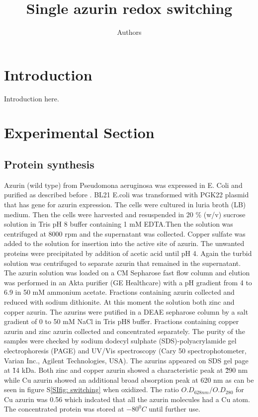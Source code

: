 \documentclass[journal=jacsat,manuscript=article]{achemso}
\author{Authors}
\affiliation{Huygens-Kamerlingh Onnes Laboratory, Leiden University, RA, Leiden, The Netherlands}
\title[]
{Single azurin redox switching}
\begin{document}
\section{Introduction}
Introduction here.
\section{Experimental Section}
\subsection{Protein synthesis}
Azurin (wild type) from Pseudomona aeruginosa was expressed in E. Coli and purified as described before \citep{kamp1990purification}. BL21 E.coli was transformed with PGK22 plasmid that has gene for azurin expression. The cells were cultured in luria broth (LB) medium. Then the cells were harvested and resuspended in 20 \% (w/v) sucrose solution in Tris pH 8 buffer containing 1 mM EDTA.Then the solution was centrifuged at 8000 rpm and the supernatant was collected. Copper sulfate was added to the solution for insertion into the active site of azurin. The unwanted proteins were precipitated by addition of acetic acid until pH 4. Again the turbid solution was centrifuged to separate azurin that remained in the supernatant. The azurin solution was loaded on a CM Sepharose fast flow column and elution was performed in an Akta purifier (GE Healthcare) with a pH gradient from 4 to 6.9 in 50 mM ammonium acetate. Fractions containing azurin collected and reduced with sodium dithionite. At this moment the solution both zinc and copper azurin. The azurins were putified in a DEAE sepharose column by a salt gradient of 0 to 50 mM NaCl in Tris pH8 buffer. Fractions containing copper azurin and zinc azurin collected and concentrated separately. The purity of the samples were checked by sodium dodecyl sulphate (SDS)-polyacrylamide gel electrophoresis (PAGE) and UV/Vis spectroscopy (Cary 50 spectrophotometer, Varian Inc., Agilent Technologies, USA). The azurins appeared on SDS gel page at \~14 kDa. Both zinc and copper azurin showed a characteristic peak at \~290 nm while Cu azurin showed an additional broad absorption peak at 620 nm as can be seen in figure S\ref{SIfig: switching} when oxidized. The ratio $O.D_{628 nm}/O.D_{280}$ for Cu azurin was 0.56 which indcated that all the azurin molecules had a Cu atom. The concentrated protein was stored at $-80^0 C$ until further use.
\end{document}
